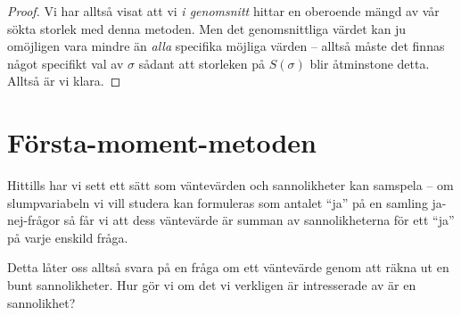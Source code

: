 \documentclass[nobib]{tufte-handout}
\begin{document}
\begin{theorem}
\begin{proof}
        Vi har alltså visat att vi \emph{i genomsnitt} hittar en oberoende mängd av vår sökta storlek med denna metoden. Men det genomsnittliga värdet kan ju omöjligen vara mindre än \emph{alla} specifika möjliga värden -- alltså måste det finnas något specifikt val av $\sigma$ sådant att storleken på $S(\sigma)$ blir åtminstone detta. Alltså är vi klara.
    \end{proof}
\end{theorem}

\section{Första-moment-metoden}

Hittills har vi sett ett sätt som väntevärden och sannolikheter kan samspela -- om slumpvariabeln vi vill studera kan formuleras som antalet ``ja'' på en samling ja-nej-frågor så får vi att dess väntevärde är summan av sannolikheterna för ett ``ja'' på varje enskild fråga.

Detta låter oss alltså svara på en fråga om ett väntevärde genom att räkna ut en bunt sannolikheter. Hur gör vi om det vi verkligen är intresserade av är en sannolikhet?
\end{document}
